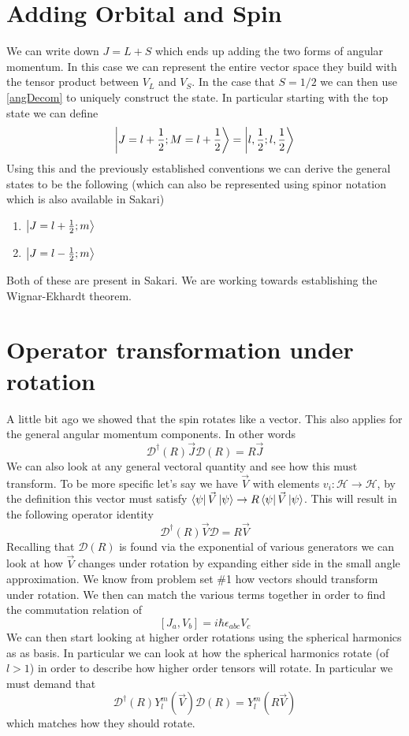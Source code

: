 \section{Adding Orbital and Spin}
We can write down $J = L + S$ which ends up adding the two forms of 
angular momentum. In this case we can represent the entire vector space they build
with the tensor product between $V_L$ and $V_S$. In the case that $S = 1/2$
we can then use \ref{angDecom} to uniquely construct the state. In particular
starting with the top state we can define
$$
    \Ket{J = l + \frac{1}{2}; M = l + \frac{1}{2}} = \Ket{l, \frac{1}{2}; l, \frac{1}{2}}
$$
Using this and the previously established conventions we can derive the general states to be
the following (which can also be represented 
using spinor notation which is also available in Sakari)
\begin{enumerate}
    \item $\Ket{J = l + \frac{1}{2}; m}$
    \item $\Ket{J = l - \frac{1}{2}; m}$
\end{enumerate}
{\color{red}Both of these are present in Sakari}. We are working towards establishing
the Wignar-Ekhardt theorem.

\section{Operator transformation under rotation}
A little bit ago we showed that the spin rotates like a vector. This also
applies for the general angular momentum components. In other words
$$
\mathcal{D}^\dagger(R) \vec{J} \mathcal{D}(R) = R \vec{J}
$$
We can also look at any general vectoral quantity and see how this
must transform. To be more specific let's say we have $\vec{V}$ with elements
$v_i: \mathcal{H} \rightarrow \mathcal{H}$, by the definition
this vector must satisfy
$\Bra{\psi} \vec{V} \Ket{\psi} \rightarrow R \Bra{\psi} \vec{V} \Ket{\psi}$.
This will result in the following operator identity
$$
\mathcal{D}^\dagger (R) \vec{V} \mathcal{D} = R \vec{V}
$$
Recalling that $\mathcal{D}(R)$ is found via the exponential of various generators
we can look at how $\vec{V}$ changes under rotation by expanding either side
in the small angle approximation. We know from problem set \#1 how vectors should
transform under rotation. We then can match the various terms together in order to find
the commutation relation of
$$
    \left[J_a, V_b\right] = i \hbar \epsilon_{abc} V_c
$$
We can then start looking at higher order rotations using the spherical harmonics as
as basis. In particular we can look at how the spherical harmonics rotate (of $l>1$)
in order to describe how higher order tensors will rotate. In particular we must
demand that
$$
\mathcal{D}^\dagger (R) Y_l^m (\vec{V}) \mathcal{D}(R) = Y_l^m (R \vec{V})
$$
which matches how they should rotate.
